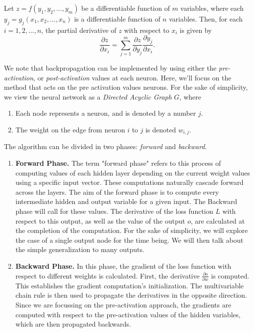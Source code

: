 \documentclass{article}
\begin{document}
\begin{theorem} \label{chain}
    Let $z = f(y_1, y_2, \ldots, y_m)$ be a differentiable function of $m$ variables, where each $y_j = g_j(x_1, x_2, \ldots, x_n)$ is a differentiable function of $n$ variables. Then, for each $i = 1, 2, \ldots, n$, the partial derivative of $z$ with respect to $x_i$ is given by
$$
\frac{\partial z}{\partial x_i} = \sum_{j=1}^{m} \frac{\partial z}{\partial y_j} \frac{\partial y_j}{\partial x_i}.$$
  \end{theorem}
  We note that backpropagation can be implemented by using either the \textit{pre-activation}, or \textit{post-activation} values at each neuron. Here, we'll focus on the method that acts on the pre activation values neurons. For the sake of simplicity, we view the neural network as a \textit{Directed Acyclic Graph} $G$, where 
  \begin{enumerate}
    \item Each node represents a neuron, and is denoted by a number $j$.
    \item The weight on the edge from neuron $i$ to $j$ is denoted $w_{i,j}$.
  \end{enumerate}
  The algorithm can be divided in two phases: \textit{forward} and \textit{backward}.
  \begin{enumerate}
    \item \textbf{Forward Phase.} The term "forward phase" refers to this process of computing values of each hidden layer depending on the current weight values using a specific input vector. These computations naturally cascade forward across the layers. The aim of the forward phase is to compute every intermediate hidden and output variable for a given input. The Backward phase will call for these values. The derivative of the loss function $L$ with respect to this output, as well as the value of the output $o$, are calculated at the completion of the computation. For the sake of simplicity, we will explore the case of a single output node for the time being. We will then talk about the simple generalization to many outputs. 

    \item \textbf{Backward Phase.} In this phase, the gradient of the loss function with respect to different weights is calculated. First, the derivative $\frac{\partial {o}}{\partial {w}} {}$ is computed. This establishes the gradient computation's initialization. The multivariable chain rule is then used to propagate the derivatives in the opposite direction. Since we are focussing on the pre-activation approach, the gradients are computed with respect to the pre-activation values of the hidden variables, which are then propagated backwards.
  \end{enumerate}
\end{document}

